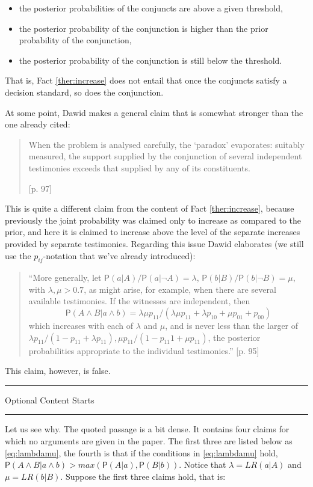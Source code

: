 \documentclass[10pt,dvipsnames,enabledeprecatedfontcommands]{scrartcl}
\newcommand{\n}{\neg}
\newcommand{\et}{\wedge}
\newcommand{\pr}[1]{\mathsf{P}(#1)}
\newcommand{\intermezzoa}{
	\begin{minipage}[c]{13cm}
	\begin{center}\rule{10cm}{0.4pt}



	\tiny{\sc Optional Content Starts}
	
	\vspace{-1mm}
	
	\rule{10cm}{0.4pt}\end{center}
	\end{minipage}\nopagebreak 
	}
\begin{document}
\begin{itemize}
\item  the posterior probabilities of the conjuncts are above a given threshold,
\item   the posterior probability of the conjunction is higher than the prior probability of the conjunction,
\item   the posterior probability of the conjunction 
 is still below the threshold.
\end{itemize}

That is, Fact \ref{ther:increase} does not entail that once the
conjuncts satisfy a decision standard, so does the conjunction.

At some point, Dawid makes a general claim that is somewhat stronger
than the one already cited:

\begin{quote} When the problem is analysed carefully, the `paradox' evaporates: suitably measured, the support supplied by the conjunction of several independent testimonies exceeds that supplied by any of its constituents.

  [p. 97]\end{quote}

This is quite a different claim from the content of Fact
\ref{ther:increase}, because previously the joint probability was
claimed only to increase as compared to the prior, and here it is
claimed to increase above the level of the separate increases provided
by separate testimonies. Regarding this issue Dawid elaborates (we still
use the \(p_{ij}\)-notation that we've already introduced):

\begin{quote}
 ``More generally, let $\pr{a\vert A}/\pr{a\vert \n A}=\lambda$, $\pr{b\vert B}/\pr{b\vert \n B}=\mu$, with $\lambda, \mu >0.7$, as might arise, for example, when there are several available testimonies. If the witnesses are
  independent, then \[\pr{A\et B\vert  a\et b} = \lambda \mu p_{11}/(\lambda \mu p_{11} + \lambda p_{10} +\mu p_{01} + p_{00})\] which  increases with
 each of $\lambda$ and $\mu$, and is never less than the larger of $\lambda p_{11}/(1-p_{11}+\lambda p_{11}),
 \mu p_{11} /(1- p_{11} 1 + \mu p_{11})$, the posterior probabilities appropriate to the individual testimonies.'' [p. 95]
 \end{quote}

This claim, however, is false.

\intermezzoa

Let us see why. The quoted passage is a bit dense. It contains four
claims for which no arguments are given in the paper. The first three
are listed below as \eqref{eq:lambdamu}, the fourth is that if the
conditions in \eqref{eq:lambdamu} hold,
\(\pr{A\et B\vert a\et b}>max(\pr{A\vert a},\pr{B\vert b})\). Notice
that \(\lambda=LR(a\vert A)\) and \(\mu=LR(b\vert B)\). Suppose the
first three claims hold, that is:
\end{document}
